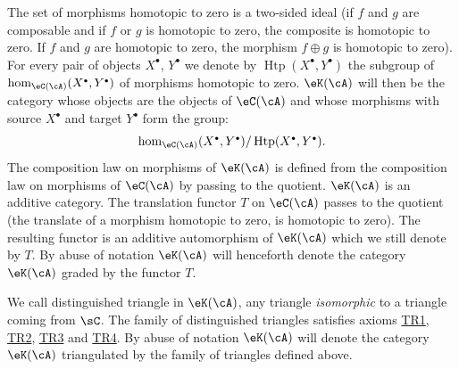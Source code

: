 The set of morphisms homotopic to zero is a two-sided ideal (if
$f$ and $g$ are composable and if $f$ or $g$ is homotopic to zero, the composite
is homotopic to zero. If $f$ and $g$ are homotopic to zero, the morphism
$f\oplus g$ is homotopic to zero). For every pair of objects $X^\bullet$,
$Y^\bullet$ we denote by $\operatorname{Htp}(X^\bullet,Y^\bullet)$ the
subgroup of $\hom_{\eC(\cA)}(X^\bullet,Y^\bullet)$ of morphisms homotopic
to zero. $\eK(\cA)$ will then be the category whose objects are the
objects of $\eC(\cA)$ and whose morphisms with source $X^\bullet$ and target
$Y^\bullet$ form the group: 
\[
  \hom_{\eC(\cA)}(X^\bullet,Y^\bullet) / \operatorname{Htp}(X^\bullet,Y^\bullet) \text{.}
\]
The composition law on morphisms of $\eK(\cA)$ is defined from
the composition law on morphisms of $\eC(\cA)$ by passing to the
quotient. $\eK(\cA)$ is an additive category. The translation functor
$T$ on $\eC(\cA)$ passes to the quotient (the translate of a morphism homotopic
to zero, is homotopic to zero). The resulting functor is an additive
automorphism of $\eK(\cA)$ which we still denote by $T$. By abuse of notation
$\eK(\cA)$ will henceforth denote the category $\eK(\cA)$ graded by the
functor $T$.

We call distinguished triangle in $\eK(\cA)$, any triangle
\emph{isomorphic} to a triangle coming from $\sC$. The family of distinguished
triangles satisfies axioms \hyperlink{VIII:TR1}{TR1},
\hyperlink{VIII:TR2}{TR2}, \hyperlink{VIII:TR3}{TR3} and
\hyperlink{VIII:TR4}{TR4}. By abuse of notation $\eK(\cA)$ will denote the
category $\eK(\cA)$ triangulated by the family of triangles defined
above. 





\subsubsection{}\label{VIII:1-2-3}

